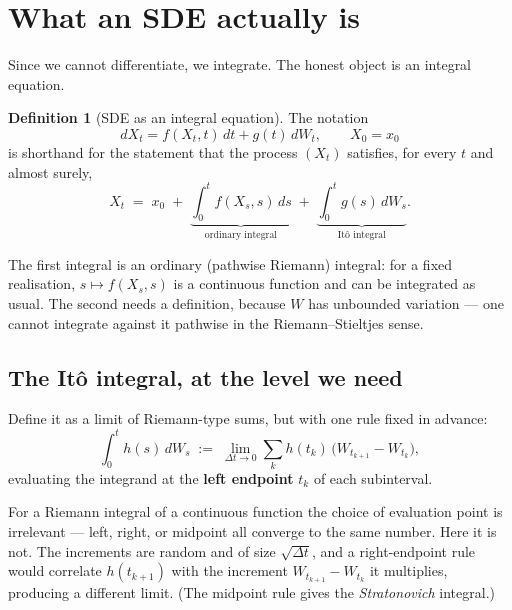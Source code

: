 \documentclass[11pt,a4paper]{report}
\theoremstyle{definition}
\newtheorem{definition}[definition]{Definition}
\theoremstyle{remark}
\begin{document}
\section{What an SDE actually is}
\label{sec:sde-integral-form}

Since we cannot differentiate, we integrate. The honest object is an
integral equation.

\begin{definition}[SDE as an integral equation]
\label{def:sde-integral}
The notation
\begin{equation}
\label{eq:sde-shorthand}
dX_t = f(X_t,t)\,dt + g(t)\,dW_t,\qquad X_0 = x_0
\end{equation}
is shorthand for the statement that the process $(X_t)$ satisfies, for every
$t$ and almost surely,
\begin{equation}
\label{eq:sde-integral}
X_t \;=\; x_0
\;+\; \underbrace{\int_0^t f(X_s,s)\,ds}_{\text{ordinary integral}}
\;+\; \underbrace{\int_0^t g(s)\,dW_s}_{\text{It\^o integral}} .
\end{equation}
\end{definition}

The first integral is an ordinary (pathwise Riemann) integral: for a fixed
realisation, $s\mapsto f(X_s,s)$ is a continuous function and can be
integrated as usual. The second needs a definition, because $W$ has
unbounded variation --- one cannot integrate against it pathwise in the
Riemann--Stieltjes sense.

\subsection{The It\^o integral, at the level we need}
\label{sec:sde-ito}

Define it as a limit of Riemann-type sums, but with one rule fixed in
advance:
\begin{equation}
\label{eq:ito-sum}
\int_0^t h(s)\,dW_s \;:=\; \lim_{\Delta t\to0}\sum_{k} h(t_k)\,
\bigl(W_{t_{k+1}}-W_{t_k}\bigr),
\end{equation}
evaluating the integrand at the \textbf{left endpoint} $t_k$ of each
subinterval.

For a Riemann integral of a continuous function the choice of evaluation
point is irrelevant --- left, right, or midpoint all converge to the same
number. Here it is not. The increments are random and of size
$\sqrt{\Delta t}$, and a right-endpoint rule would correlate $h(t_{k+1})$
with the increment $W_{t_{k+1}}-W_{t_k}$ it multiplies, producing a
different limit. (The midpoint rule gives the \emph{Stratonovich} integral.)
\end{document}
